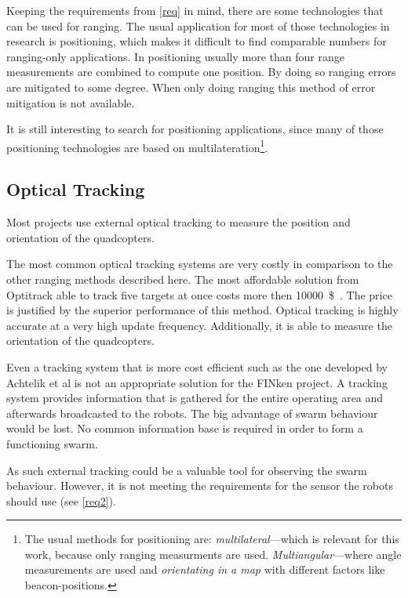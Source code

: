 Keeping the requirements from \autoref{req} in mind, there are some technologies that can be used for ranging.
The usual application for most of those technologies in research is positioning, which makes it difficult to find comparable numbers for ranging-only applications.
In positioning usually more than four range measurements are combined to compute one position.
By doing so ranging errors are mitigated to some degree.
When only doing ranging this method of error mitigation is not available.

It is still interesting to search for positioning applications, since many of those positioning technologies are based on multilateration\footnote{
The usual methods for positioning are: \emph{multilateral}—which is relevant for this work, because only ranging measurments are used. \emph{Multiangular}—where angle measurements are used and \emph{orientating in a map} with different factors like beacon-positions.}.
\cite{_multilateration_2015}

\subsection{Optical Tracking}
Most projects use external optical tracking to measure the position and orientation of the quadcopters. 

The most common optical tracking systems are very costly in comparison to the other ranging methods described here.
The most affordable solution from Optitrack able to track five targets at once costs more then \SI{10000}{\$}~\cite{optitrack.com}.
The price is justified by the superior performance of this method.
Optical tracking is highly accurate at a very high update frequency.
Additionally, it is able to measure the orientation of the quadcopters.


Even a tracking system that is more cost efficient such as the one developed by Achtelik et al\cite{Achtelik2009} is not an appropriate solution for the FINken project.
A tracking system provides information that is gathered for the entire operating area and afterwards broadcasted to the robots.
The big advantage of swarm behaviour would be lost.
No common information base is required in order to form a functioning swarm.

As such external tracking could be a valuable tool for observing the swarm behaviour.
However, it is not meeting the requirements for the sensor the robots should use (see \autoref{req2}).

